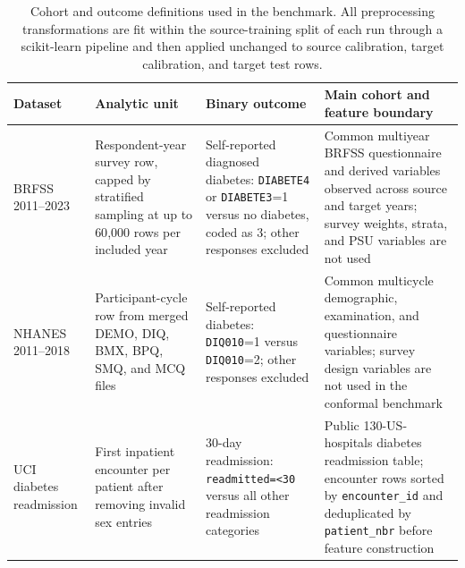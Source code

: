 \begin{table}[!tbp]
\centering
\caption{Cohort and outcome definitions used in the benchmark. All preprocessing transformations are fit within the source-training split of each run through a scikit-learn pipeline and then applied unchanged to source calibration, target calibration, and target test rows.}
\label{tab:cohort_definitions}
\footnotesize
\setlength{\tabcolsep}{3pt}
\renewcommand{\arraystretch}{1.08}
\begin{tabularx}{\textwidth}{@{}L{2.0cm}YYY@{}}
\toprule
Dataset & Analytic unit & Binary outcome & Main cohort and feature boundary \\
\midrule
BRFSS 2011--2023 & Respondent-year survey row, capped by stratified sampling at up to 60{,}000 rows per included year & Self-reported diagnosed diabetes: \texttt{DIABETE4} or \texttt{DIABETE3}=1 versus no diabetes, coded as 3; other responses excluded & Common multiyear BRFSS questionnaire and derived variables observed across source and target years; survey weights, strata, and PSU variables are not used \\
NHANES 2011--2018 & Participant-cycle row from merged DEMO, DIQ, BMX, BPQ, SMQ, and MCQ files & Self-reported diabetes: \texttt{DIQ010}=1 versus \texttt{DIQ010}=2; other responses excluded & Common multicycle demographic, examination, and questionnaire variables; survey design variables are not used in the conformal benchmark \\
UCI diabetes readmission & First inpatient encounter per patient after removing invalid sex entries & 30-day readmission: \texttt{readmitted=<30} versus all other readmission categories & Public 130-US-hospitals diabetes readmission table; encounter rows sorted by \texttt{encounter\_id} and deduplicated by \texttt{patient\_nbr} before feature construction \\
\bottomrule
\end{tabularx}
\end{table}
